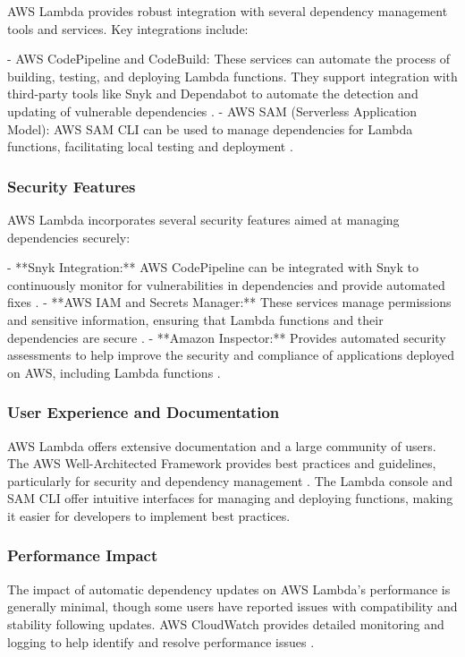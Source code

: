 \documentclass[sigconf]{acmart}
\begin{document}
AWS Lambda provides robust integration with several dependency management tools and services. Key integrations include:

- AWS CodePipeline and CodeBuild: These services can automate the process of building, testing, and deploying Lambda functions. They support integration with third-party tools like Snyk and Dependabot to automate the detection and updating of vulnerable dependencies \cite{awsCI2023}.
- AWS SAM (Serverless Application Model): AWS SAM CLI can be used to manage dependencies for Lambda functions, facilitating local testing and deployment \cite{awssam2023}.

\subsubsection{Security Features}

AWS Lambda incorporates several security features aimed at managing dependencies securely:

- **Snyk Integration:** AWS CodePipeline can be integrated with Snyk to continuously monitor for vulnerabilities in dependencies and provide automated fixes \cite{snykaws2023}.
- **AWS IAM and Secrets Manager:** These services manage permissions and sensitive information, ensuring that Lambda functions and their dependencies are secure \cite{awsSecurity2023}.
- **Amazon Inspector:** Provides automated security assessments to help improve the security and compliance of applications deployed on AWS, including Lambda functions \cite{awsinspector2023}.

\subsubsection{User Experience and Documentation}

AWS Lambda offers extensive documentation and a large community of users. The AWS Well-Architected Framework provides best practices and guidelines, particularly for security and dependency management \cite{awsWell2023}. The Lambda console and SAM CLI offer intuitive interfaces for managing and deploying functions, making it easier for developers to implement best practices.

\subsubsection{Performance Impact}

The impact of automatic dependency updates on AWS Lambda's performance is generally minimal, though some users have reported issues with compatibility and stability following updates. AWS CloudWatch provides detailed monitoring and logging to help identify and resolve performance issues \cite{lambdaPerformance2023}.
\end{document}
